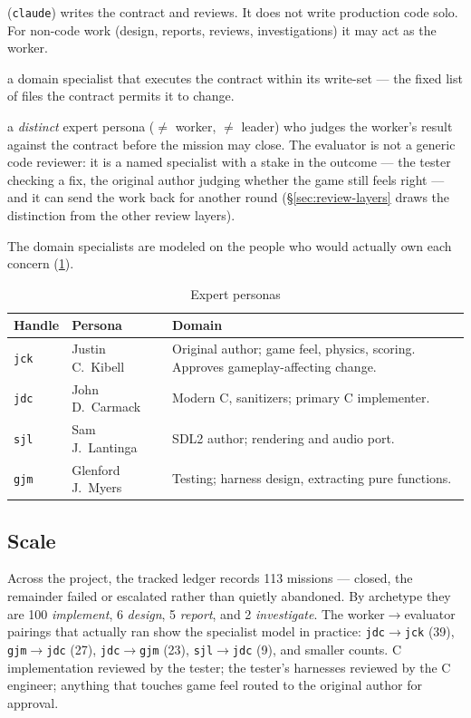 \documentclass[11pt,a4paper]{article}
\begin{document}
\begin{description}[nosep]
  \item[Leader] (\texttt{claude}) writes the contract and reviews. It does
        not write production code solo. For non-code work (design, reports,
        reviews, investigations) it may act as the worker.
  \item[Worker] a domain specialist that executes the contract within its
        write-set --- the fixed list of files the contract permits it to change.
  \item[Evaluator] a \emph{distinct} expert persona ($\neq$ worker,
        $\neq$ leader) who judges the worker's result against the contract
        before the mission may close. The evaluator is not a generic code
        reviewer: it is a named specialist with a stake in the outcome ---
        the tester checking a fix, the original author judging whether the
        game still feels right --- and it can send the work back for another
        round (\S\ref{sec:review-layers} draws the distinction from the other
        review layers).
\end{description}

The domain specialists are modeled on the people who would actually own
each concern (\cref{tab:personas}).

\begin{table}[h]
\centering
\caption{Expert personas}
\label{tab:personas}
\begin{tabularx}{\textwidth}{llX}
\toprule
\textbf{Handle} & \textbf{Persona} & \textbf{Domain} \\
\midrule
\texttt{jck} & Justin C.\ Kibell   & Original author; game feel, physics, scoring. Approves gameplay-affecting change. \\
\texttt{jdc} & John D.\ Carmack     & Modern C, sanitizers; primary C implementer. \\
\texttt{sjl} & Sam J.\ Lantinga     & SDL2 author; rendering and audio port. \\
\texttt{gjm} & Glenford J.\ Myers   & Testing; harness design, extracting pure functions. \\
\bottomrule
\end{tabularx}
\end{table}

\subsection{Scale}

Across the project, the tracked ledger
 records 113 missions ---
\MetricClosedMissions{} closed, the remainder failed or escalated rather than
quietly abandoned. By archetype they are 100 \emph{implement}, 6
\emph{design}, 5 \emph{report}, and 2 \emph{investigate}. The
worker$\to$evaluator pairings that actually ran show the specialist model in
practice: \texttt{jdc}$\to$\texttt{jck} (39),
\texttt{gjm}$\to$\texttt{jdc} (27), \texttt{jdc}$\to$\texttt{gjm} (23),
\texttt{sjl}$\to$\texttt{jdc} (9), and smaller counts. C implementation
reviewed by the tester; the tester's harnesses reviewed by the C engineer;
anything that touches game feel routed to the original author for approval.
\end{document}
